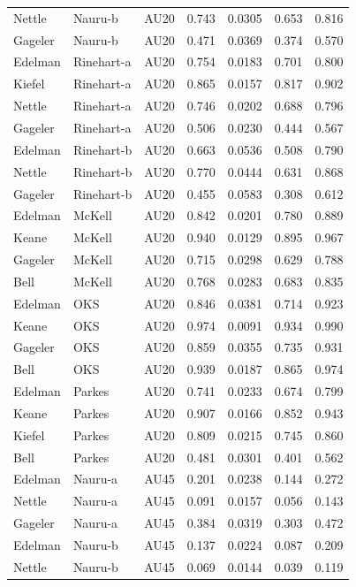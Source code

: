\documentclass{monashthesis}
\begin{document}
\begin{center}
\begin{longtable}{lllllll}
Nettle & Nauru-b & AU20 & 0.743 & 0.0305 & 0.653 & 0.816 \\
Gageler & Nauru-b & AU20 & 0.471 & 0.0369 & 0.374 & 0.570 \\
Edelman & Rinehart-a & AU20 & 0.754 & 0.0183 & 0.701 & 0.800 \\
Kiefel & Rinehart-a & AU20 & 0.865 & 0.0157 & 0.817 & 0.902 \\
Nettle & Rinehart-a & AU20 & 0.746 & 0.0202 & 0.688 & 0.796 \\
Gageler & Rinehart-a & AU20 & 0.506 & 0.0230 & 0.444 & 0.567 \\
Edelman & Rinehart-b & AU20 & 0.663 & 0.0536 & 0.508 & 0.790 \\
Nettle & Rinehart-b & AU20 & 0.770 & 0.0444 & 0.631 & 0.868 \\
Gageler & Rinehart-b & AU20 & 0.455 & 0.0583 & 0.308 & 0.612 \\
Edelman & McKell & AU20 & 0.842 & 0.0201 & 0.780 & 0.889 \\
Keane & McKell & AU20 & 0.940 & 0.0129 & 0.895 & 0.967 \\
Gageler & McKell & AU20 & 0.715 & 0.0298 & 0.629 & 0.788 \\
Bell & McKell & AU20 & 0.768 & 0.0283 & 0.683 & 0.835 \\
Edelman & OKS & AU20 & 0.846 & 0.0381 & 0.714 & 0.923 \\
Keane & OKS & AU20 & 0.974 & 0.0091 & 0.934 & 0.990 \\
Gageler & OKS & AU20 & 0.859 & 0.0355 & 0.735 & 0.931 \\
Bell & OKS & AU20 & 0.939 & 0.0187 & 0.865 & 0.974 \\
Edelman & Parkes & AU20 & 0.741 & 0.0233 & 0.674 & 0.799 \\
Keane & Parkes & AU20 & 0.907 & 0.0166 & 0.852 & 0.943 \\
Kiefel & Parkes & AU20 & 0.809 & 0.0215 & 0.745 & 0.860 \\
Bell & Parkes & AU20 & 0.481 & 0.0301 & 0.401 & 0.562 \\
Edelman & Nauru-a & AU45 & 0.201 & 0.0238 & 0.144 & 0.272 \\
Nettle & Nauru-a & AU45 & 0.091 & 0.0157 & 0.056 & 0.143 \\
Gageler & Nauru-a & AU45 & 0.384 & 0.0319 & 0.303 & 0.472 \\
Edelman & Nauru-b & AU45 & 0.137 & 0.0224 & 0.087 & 0.209 \\
Nettle & Nauru-b & AU45 & 0.069 & 0.0144 & 0.039 & 0.119 \\

\end{longtable}
\end{center}
\end{document}
